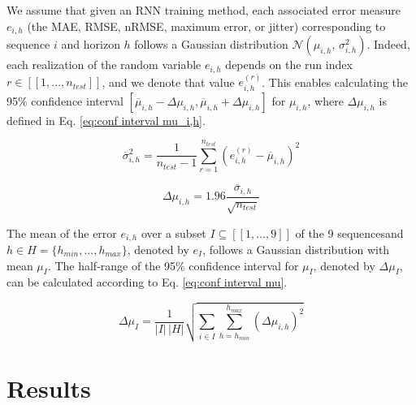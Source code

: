 \documentclass[twocolumn,a4paper]{svjour3} \sloppy          \smartqed
\begin{document}
We assume that given an RNN training method, each associated error measure $e_{i,h}$ (the MAE, RMSE, nRMSE, maximum error, or jitter) corresponding to sequence $i$ and horizon $h$ follows a Gaussian distribution $\mathcal{N}(\mu_{i,h},\,\sigma_{i,h}^{2})$. Indeed, each realization of the random variable $e_{i,h}$ depends on the run index $r \in [\![ 1, ..., n_{test} ]\!] $, and we denote that value $e_{i,h}^{(r)}$. This enables calculating the 95\% confidence interval $[ \overline{\mu}_{i,h} - \Delta \mu_{i,h}, \overline{\mu}_{i,h} + \Delta \mu_{i,h}]$ for $\mu_{i,h}$, where $\Delta \mu_{i,h}$ is defined in Eq. \ref{eq:conf interval mu_i,h}. \footnotemark


\begin{equation} \label{eq:std dev error}
\overline{\sigma}_{i,h}^2 = \frac{1}{n_{test} - 1} \sum_{r = 1}^{n_{test}} \left( e_{i,h}^{(r)} - \overline{\mu}_{i,h} \right)^2
\end{equation}

\begin{equation} \label{eq:conf interval mu_i,h}
\Delta \mu_{i,h} = 1.96 \frac{\overline{\sigma}_{i,h}}{\sqrt{n_{test}}}
\end{equation}

The mean of the error $e_{i,h}$ over a subset $I \subseteq [\![ 1, ..., 9 ]\!]$ of the 9 sequences\footnotemark and $h \in H = \{ h_{min}, ..., h_{max} \}$, denoted by $e_I$, follows a Gaussian distribution with mean $\mu_I$. The half-range of the 95\% confidence interval for $\mu_I$, denoted by $\Delta \mu_I$, can be calculated according to Eq. \ref{eq:conf interval mu}.


\begin{equation} \label{eq:conf interval mu}
\Delta \mu_I = \frac{1}{|I| \, |H|} \sqrt{\sum_{i \in I} \sum_{h=h_{min}}^{h_{max}} (\Delta \mu_{i,h})^2}
\end{equation}


\section{Results}
\end{document}
